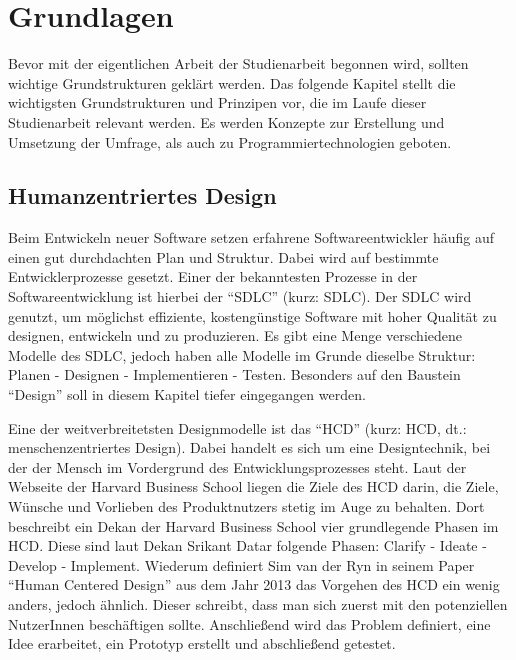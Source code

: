 
\chapter{Grundlagen}
\label{chapter:3}

Bevor mit der eigentlichen Arbeit der Studienarbeit begonnen wird, sollten wichtige Grundstrukturen geklärt werden.
Das folgende Kapitel stellt die wichtigsten Grundstrukturen und Prinzipen vor, die im Laufe dieser Studienarbeit relevant werden.
Es werden Konzepte zur Erstellung und Umsetzung der Umfrage, als auch zu Programmiertechnologien geboten.

\section{Humanzentriertes Design}

Beim Entwickeln neuer Software setzen erfahrene Softwareentwickler häufig auf einen gut durchdachten Plan und Struktur.
Dabei wird auf bestimmte Entwicklerprozesse gesetzt.
Einer der bekanntesten Prozesse in der Softwareentwicklung ist hierbei der “\acf{SDLC}” (kurz: \acs{SDLC}). Der \acs{SDLC} wird genutzt, um möglichst effiziente, kostengünstige Software mit hoher Qualität zu designen, entwickeln und zu produzieren.\cite{shylesh:2017}
Es gibt eine Menge verschiedene Modelle des \acs{SDLC}, jedoch haben alle Modelle im Grunde dieselbe Struktur: Planen - Designen - Implementieren - Testen. Besonders auf den Baustein “Design” soll in diesem Kapitel tiefer eingegangen werden.

Eine der weitverbreitetsten Designmodelle ist das “\acf{HCD}” (kurz: \acs{HCD}, dt.: menschenzentriertes Design).  Dabei handelt es sich um eine Designtechnik, bei der der Mensch im Vordergrund des Entwicklungsprozesses steht.\cite{hbsc:2020} Laut der Webseite der Harvard Business School liegen die Ziele des \acs{HCD} darin, die Ziele, Wünsche und Vorlieben des Produktnutzers stetig im Auge zu behalten.\cite{hbsc:2020} Dort beschreibt ein Dekan der Harvard Business School vier grundlegende Phasen im \acs{HCD}. Diese sind laut Dekan Srikant Datar folgende Phasen: Clarify - Ideate - Develop - Implement.\cite{hbsc:2020} Wiederum definiert Sim van der Ryn in seinem Paper “Human Centered Design” aus dem Jahr 2013 das Vorgehen des \acs{HCD} ein wenig anders, jedoch ähnlich. Dieser schreibt, dass man sich zuerst mit den potenziellen NutzerInnen beschäftigen sollte.\cite{vanderryn:2013} Anschließend wird das Problem definiert, eine Idee erarbeitet, ein Prototyp erstellt und abschließend getestet.\cite{vanderryn:2013}

